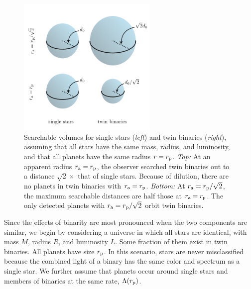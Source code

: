 \documentclass[12pt,modern]{aastex61}
\renewcommand{\a}{_{\rm a}}
\newcommand{\p}{_{\rm p}}
\begin{document}
\begin{figure}[!tb]
    \begin{center}
        \includegraphics[width=0.6\textwidth]{figures/visualize_volumes.pdf}
    \end{center}
    \caption{
        Searchable volumes for single stars ({\it left}) and twin
        binaries ({\it right}), assuming that all stars have the same
        mass, radius, and luminosity, and that all planets have the
        same radius $r=r\p$.
        {\it Top:} At an apparent radius $r\a=r\p$, the observer
        searched twin binaries out to a distance $\sqrt{2}\times$ that
        of single stars.  Because of dilution, there are no planets in
        twin binaries with $r\a=r\p$.
        {\it Bottom:} At $r\a=r\p/\sqrt{2}$, the maximum searchable
        distances are half those at $r\a=r\p$.  The only detected
        planets with $r\a=r\p/\sqrt{2}$ orbit twin binaries.
    }
    \label{fig:model_1_volumes}
\end{figure}

Since the effects of binarity are most pronounced when the two
components are similar, we begin by considering a universe in which
all stars are identical, with mass $M$, radius $R$, and luminosity
$L$.  Some fraction of them exist in twin binaries. All planets have
size $r\p$.  In this scenario, stars are never misclassified because
the combined light of a binary has the same color and spectrum as a
single star.  We further assume that planets occur around single stars
and members of binaries at the same rate, $\Lambda(r\p)$.
\end{document}
